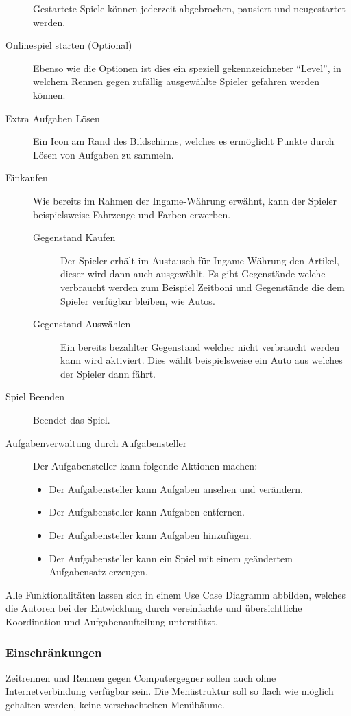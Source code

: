 \begin{description}
{\begin{description}
			\end{description}
			Gestartete Spiele können jederzeit abgebrochen, pausiert und neugestartet werden.
		}
		\item[Onlinespiel starten (Optional)]{ Ebenso wie die Optionen ist dies ein speziell gekennzeichneter \enquote{Level}, in welchem Rennen gegen zufällig ausgewählte Spieler gefahren werden können. }
		\item[Extra Aufgaben Lösen]{ Ein Icon am Rand des Bildschirms, welches es ermöglicht Punkte durch Lösen von Aufgaben zu sammeln. }
		\item[Einkaufen]{ Wie bereits im Rahmen der Ingame-Währung erwähnt, kann der Spieler beispielsweise Fahrzeuge und Farben erwerben.
			\begin{description}
				\item[Gegenstand Kaufen]{ Der Spieler erhält im Austausch für Ingame-Währung den Artikel, dieser wird dann auch ausgewählt. Es gibt Gegenstände welche verbraucht werden zum Beispiel Zeitboni und Gegenstände die dem Spieler verfügbar bleiben, wie Autos. }
				\item[Gegenstand Auswählen]{ Ein bereits bezahlter Gegenstand welcher nicht verbraucht werden kann wird aktiviert. Dies wählt beispielsweise ein Auto aus welches der Spieler dann fährt. }
			\end{description}
		}
		\item[Spiel Beenden]{ Beendet das Spiel. }
		\item[Aufgabenverwaltung durch Aufgabensteller]{
			Der Aufgabensteller kann folgende Aktionen machen:
			\begin{itemize}
				\item{ Der Aufgabensteller kann Aufgaben ansehen und verändern. }
				\item{ Der Aufgabensteller kann Aufgaben entfernen. }
				\item{ Der Aufgabensteller kann Aufgaben hinzufügen. }
				\item{ Der Aufgabensteller kann ein Spiel mit einem geändertem Aufgabensatz erzeugen.	}
			\end{itemize}
		}
	\end{description}
	Alle Funktionalitäten lassen sich in einem Use Case Diagramm abbilden, welches die Autoren bei der Entwicklung durch vereinfachte und übersichtliche Koordination und Aufgabenaufteilung unterstützt.
	\label{ssec:ucd}

	\subsubsection{Einschränkungen}
		Zeitrennen und Rennen gegen Computergegner sollen auch ohne Internetverbindung verfügbar sein.
		Die Menüstruktur soll so flach wie möglich gehalten werden, keine verschachtelten Menübäume.
